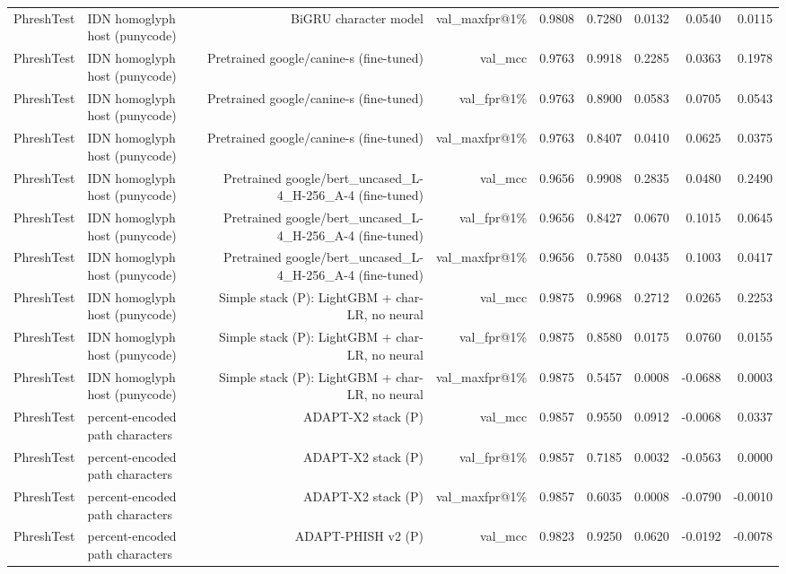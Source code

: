 \begin{table}[t]
\begin{tabular}{llrrrrrrr}
PhreshTest & IDN homoglyph host (punycode) & BiGRU character model & val\_maxfpr@1\% & 0.9808 & 0.7280 & 0.0132 & 0.0540 & 0.0115 \\
PhreshTest & IDN homoglyph host (punycode) & Pretrained google/canine-s (fine-tuned) & val\_mcc & 0.9763 & 0.9918 & 0.2285 & 0.0363 & 0.1978 \\
PhreshTest & IDN homoglyph host (punycode) & Pretrained google/canine-s (fine-tuned) & val\_fpr@1\% & 0.9763 & 0.8900 & 0.0583 & 0.0705 & 0.0543 \\
PhreshTest & IDN homoglyph host (punycode) & Pretrained google/canine-s (fine-tuned) & val\_maxfpr@1\% & 0.9763 & 0.8407 & 0.0410 & 0.0625 & 0.0375 \\
PhreshTest & IDN homoglyph host (punycode) & Pretrained google/bert\_uncased\_L-4\_H-256\_A-4 (fine-tuned) & val\_mcc & 0.9656 & 0.9908 & 0.2835 & 0.0480 & 0.2490 \\
PhreshTest & IDN homoglyph host (punycode) & Pretrained google/bert\_uncased\_L-4\_H-256\_A-4 (fine-tuned) & val\_fpr@1\% & 0.9656 & 0.8427 & 0.0670 & 0.1015 & 0.0645 \\
PhreshTest & IDN homoglyph host (punycode) & Pretrained google/bert\_uncased\_L-4\_H-256\_A-4 (fine-tuned) & val\_maxfpr@1\% & 0.9656 & 0.7580 & 0.0435 & 0.1003 & 0.0417 \\
PhreshTest & IDN homoglyph host (punycode) & Simple stack (P): LightGBM + char-LR, no neural & val\_mcc & 0.9875 & 0.9968 & 0.2712 & 0.0265 & 0.2253 \\
PhreshTest & IDN homoglyph host (punycode) & Simple stack (P): LightGBM + char-LR, no neural & val\_fpr@1\% & 0.9875 & 0.8580 & 0.0175 & 0.0760 & 0.0155 \\
PhreshTest & IDN homoglyph host (punycode) & Simple stack (P): LightGBM + char-LR, no neural & val\_maxfpr@1\% & 0.9875 & 0.5457 & 0.0008 & -0.0688 & 0.0003 \\
PhreshTest & percent-encoded path characters & ADAPT-X2 stack (P) & val\_mcc & 0.9857 & 0.9550 & 0.0912 & -0.0068 & 0.0337 \\
PhreshTest & percent-encoded path characters & ADAPT-X2 stack (P) & val\_fpr@1\% & 0.9857 & 0.7185 & 0.0032 & -0.0563 & 0.0000 \\
PhreshTest & percent-encoded path characters & ADAPT-X2 stack (P) & val\_maxfpr@1\% & 0.9857 & 0.6035 & 0.0008 & -0.0790 & -0.0010 \\
PhreshTest & percent-encoded path characters & ADAPT-PHISH v2 (P) & val\_mcc & 0.9823 & 0.9250 & 0.0620 & -0.0192 & -0.0078 \\

\end{tabular}
\end{table}
